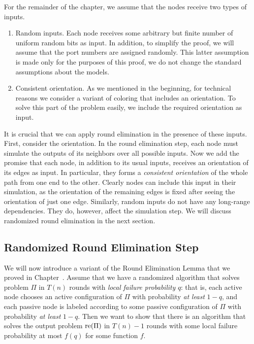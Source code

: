 For the remainder of the chapter, we assume that the nodes receive two types of inputs.
\begin{enumerate}
	\item Random inputs. Each node receives some arbitrary but finite number of uniform random bits as input. In addition, to simplify the proof, we will assume that the port numbers are assigned randomly. This latter assumption is made only for the purposes of this proof, we do not change the standard assumptions about the models.
	\item Consistent orientation. As we mentioned in the beginning, for technical reasons we consider a variant of coloring that includes an orientation. To solve this part of the problem easily, we include the required orientation as input.
\end{enumerate}
It is crucial that we can apply round elimination in the presence of these inputs. First, consider the orientation. In the round elimination step, each node must simulate the outputs of its neighbors over all possible inputs. Now we add the promise that each node, in addition to its usual inputs, receives an orientation of its edges as input. In particular, they forms a \emph{consistent orientation} of the whole path from one end to the other. Clearly nodes can include this input in their simulation, as the orientation of the remaining edges is fixed after seeing the orientation of just one edge. Similarly, random inputs do not have any long-range dependencies. They do, however, affect the simulation step. We will discuss randomized round elimination in the next section.

\subsection{Randomized Round Elimination Step} \label{ssec:rand-re}

We will now introduce a variant of the Round Elimination Lemma that we proved in Chapter~. Assume that we have a randomized algorithm that solves problem $\Pi$ in $T(n)$ rounds with \emph{local failure probability $q$}: that is, each active node chooses an active configuration of $\Pi$ with probability \emph{at least} $1-q$, and each passive node is labeled according to some passive configuration of $\Pi$ with probability \emph{at least} $1-q$. Then we want to show that there is an algorithm that solves the output problem $\operatorname{re}(\Pi)$ in $T(n)-1$ rounds with some local failure probability at most $f(q)$ for some function $f$.

